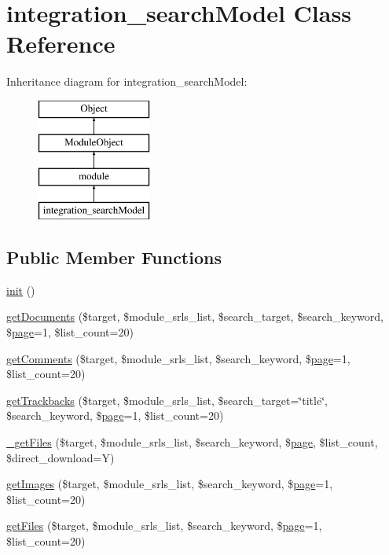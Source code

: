 \hypertarget{classintegration__searchModel}{}\section{integration\+\_\+search\+Model Class Reference}
\label{classintegration__searchModel}
Inheritance diagram for integration\+\_\+search\+Model\+:\begin{figure}[H]
\begin{center}
\leavevmode
\includegraphics[height=4.000000cm]{classintegration__searchModel}
\end{center}
\end{figure}
\subsection*{Public Member Functions}
\begin{DoxyCompactItemize}
\item 
\hyperlink{classintegration__searchModel_a77ba2cc52ea9843a6812274785a9393f}{init} ()
\item 
\hyperlink{classintegration__searchModel_ac5879957a3ab4f84fb0d6341ca109d8b}{get\+Documents} (\$target, \$module\+\_\+srls\+\_\+list, \$search\+\_\+target, \$search\+\_\+keyword, \$\hyperlink{classpage}{page}=1, \$list\+\_\+count=20)
\item 
\hyperlink{classintegration__searchModel_a4c3399ca8e295b6f427df69e5b417343}{get\+Comments} (\$target, \$module\+\_\+srls\+\_\+list, \$search\+\_\+keyword, \$\hyperlink{classpage}{page}=1, \$list\+\_\+count=20)
\item 
\hyperlink{classintegration__searchModel_a2426cde11df714af3ff96d83366f9752}{get\+Trackbacks} (\$target, \$module\+\_\+srls\+\_\+list, \$search\+\_\+target=\char`\"{}title\char`\"{}, \$search\+\_\+keyword, \$\hyperlink{classpage}{page}=1, \$list\+\_\+count=20)
\item 
\hyperlink{classintegration__searchModel_a88561e8ec8d5c401cee5220a0297d6e9}{\+\_\+get\+Files} (\$target, \$module\+\_\+srls\+\_\+list, \$search\+\_\+keyword, \$\hyperlink{classpage}{page}, \$list\+\_\+count, \$direct\+\_\+download=\textquotesingle{}Y\textquotesingle{})
\item 
\hyperlink{classintegration__searchModel_ad46ab3c6bb406037c82feeb554a89b05}{get\+Images} (\$target, \$module\+\_\+srls\+\_\+list, \$search\+\_\+keyword, \$\hyperlink{classpage}{page}=1, \$list\+\_\+count=20)
\item 
\hyperlink{classintegration__searchModel_ad2aca662d598b44aa69c228f2b588a61}{get\+Files} (\$target, \$module\+\_\+srls\+\_\+list, \$search\+\_\+keyword, \$\hyperlink{classpage}{page}=1, \$list\+\_\+count=20)
\end{DoxyCompactItemize}
